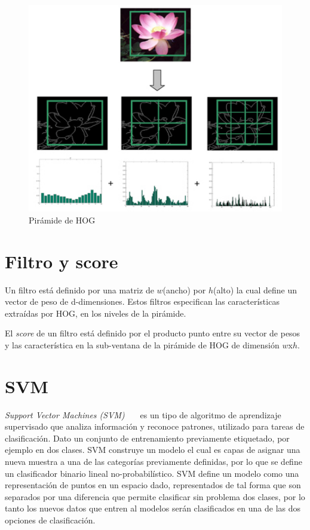 \begin{figure}[tb]
  \centering
   \includegraphics[width=1\textwidth]{Figuras/phog.jpg}
   \caption{Pirámide de HOG~\cite{pyra}}
   \label{fig:hog_pyra}
\end{figure}

\section{Filtro y score}\label{sec:fas}

Un filtro está definido por una matriz de $w$(ancho) por $h$(alto) la cual define un vector de peso de d-dimensiones. Estos filtros especifican las características extraídas por HOG, en los niveles de la pirámide.

El \textit{score} de un filtro está definido por el producto punto entre su vector de pesos y las característica en la sub-ventana de la pirámide de HOG de dimensión $w$x$h$.
\section{SVM}\label{sec:lsvm}

\textit{Support Vector Machines (SVM)}~\cite{Vapnik1995}~\cite{Duda2000}~\cite{Cortes1995} es un tipo de algoritmo de aprendizaje supervisado que analiza información y reconoce patrones, utilizado para tareas de clasificación. Dato un conjunto de entrenamiento previamente etiquetado, por ejemplo en dos clases. SVM construye un modelo el cual es capas de asignar una nueva muestra a una de las categorías previamente definidas, por lo que se define un clasificador binario lineal no-probabilístico.
SVM define un modelo como una representación de puntos en un espacio dado, representados de tal forma que son separados por una diferencia que permite clasificar sin problema dos clases, por lo tanto los nuevos datos que entren al modelos serán clasificados en una de las dos opciones de clasificación.

